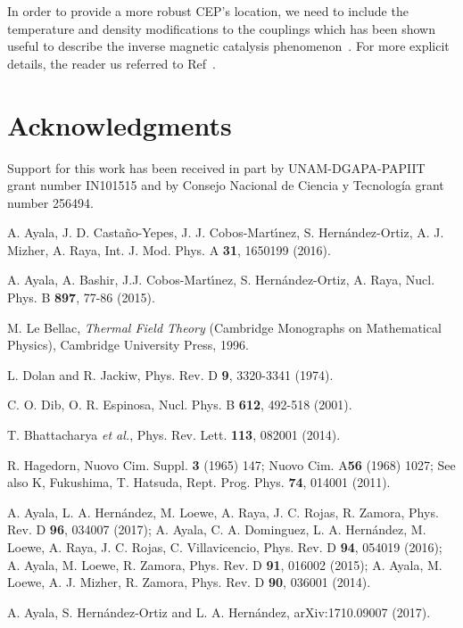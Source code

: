 \documentclass[%
 reprint,
showpacs,preprintnumbers,
 amsmath,amssymb,
onecolumn]{revtex4}
\begin{document}
In order to provide a more robust CEP's location, we need to include the temperature and density modifications to the couplings which has been shown useful to describe the inverse magnetic catalysis phenomenon~\cite{inverse}. For more explicit details, the reader us referred to Ref~\cite{Ayala3}.

\section*{Acknowledgments}

Support for this work has been received in part by UNAM-DGAPA-PAPIIT grant number IN101515 and by Consejo Nacional de Ciencia y Tecnolog\'ia grant number 256494.


% 
%
%
\begin{thebibliography}{55}
%
 A. Ayala, J. D. Casta\~no-Yepes, J. J. Cobos-Mart\'{\i}nez, S. Hern\'andez-Ortiz, A. J. Mizher, A. Raya, Int. J. Mod. Phys. A {\bf 31}, 1650199 (2016). 

 A. Ayala, A. Bashir, J.J. Cobos-Mart\'{\i}nez, S. Hern\'andez-Ortiz, A. Raya, Nucl. Phys. B {\bf 897}, 77-86 (2015).

 M. Le Bellac, {\it Thermal Field Theory}  (Cambridge Monographs on Mathematical Physics), Cambridge University Press, 1996. 

 L. Dolan and R. Jackiw, Phys. Rev. D {\bf 9}, 3320-3341 (1974).

 C. O. Dib, O. R. Espinosa, Nucl. Phys. B {\bf 612}, 492-518 (2001).

 T. Bhattacharya {\it et al.}, Phys. Rev. Lett. {\bf 113}, 082001
(2014).

 R. Hagedorn, Nuovo Cim. Suppl. {\bf 3} (1965) 147; Nuovo Cim. A{\bf 56} (1968) 1027; See also K, Fukushima, T. Hatsuda, Rept. Prog. Phys. {\bf 74}, 014001 (2011).

 A. Ayala, L. A. Hern\'andez, M. Loewe, A. Raya, J. C. Rojas, R. Zamora, Phys. Rev. D {\bf 96}, 034007 (2017); A. Ayala, C. A. Dominguez, L. A. Hern\'andez, M. Loewe, A. Raya, J. C. Rojas, C. Villavicencio, Phys. Rev. D {\bf 94}, 054019 (2016); A. Ayala, M. Loewe, R. Zamora, Phys. Rev. D {\bf 91}, 016002 (2015); A. Ayala, M. Loewe, A. J. Mizher, R. Zamora, Phys. Rev. D {\bf 90}, 036001 (2014). 

 A. Ayala, S. Hern\'andez-Ortiz and L. A. Hern\'andez, arXiv:1710.09007 (2017).
%


\end{thebibliography}
\end{document}
